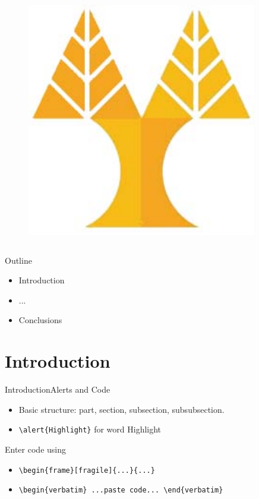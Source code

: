 \documentclass[hyperref={pdfpagelabels=false}]{beamer}
\begin{document}
\begin{frame}
\begin{columns}
\begin{column}{3cm}
\begin{figure}
			\end{figure}
			\begin{figure}
			\includegraphics[totalheight=1.5cm]{./figures/ucylogo.pdf} 
			\end{figure}
		\end{column}
	\end{columns}
\end{frame}



\begin{frame}{Outline}
	\begin{itemize}
	\item Introduction
	\item ...
	\item Conclusions
\end{itemize}	
\end{frame}

\part{Introduction}
\frame{\partpage}
%

%
\begin{frame}[fragile]{Introduction}{Alerts and Code}
\begin{itemize}
\item Basic structure: part, section, subsection, subsubsection.
\item \verb+\alert{Highlight}+ for word \alert{Highlight}
\end{itemize}
Enter code using 
\begin{itemize}
\item  \verb+\begin{frame}[fragile]{...}{...}+
\item \verb+\begin{verbatim} ...paste code... \end{verbatim}+
\end{itemize}
\end{frame}	
\end{document}

